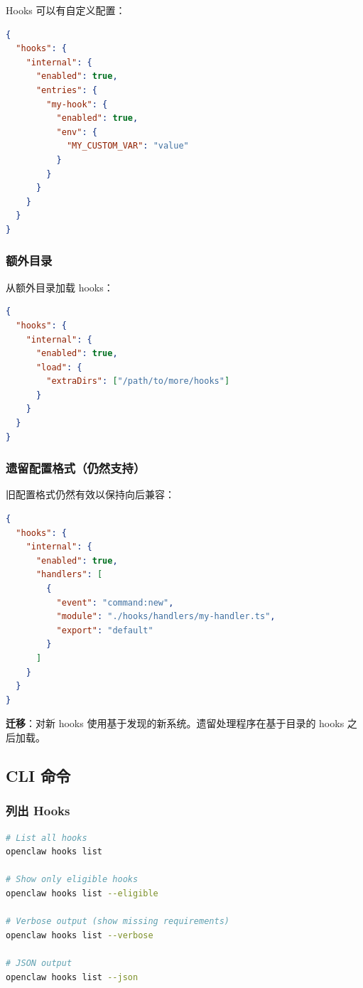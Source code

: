 Hooks 可以有自定义配置：

\begin{lstlisting}[language=json]
{
  "hooks": {
    "internal": {
      "enabled": true,
      "entries": {
        "my-hook": {
          "enabled": true,
          "env": {
            "MY_CUSTOM_VAR": "value"
          }
        }
      }
    }
  }
}
\end{lstlisting}


\subsubsection{额外目录}


从额外目录加载 hooks：

\begin{lstlisting}[language=json]
{
  "hooks": {
    "internal": {
      "enabled": true,
      "load": {
        "extraDirs": ["/path/to/more/hooks"]
      }
    }
  }
}
\end{lstlisting}


\subsubsection{遗留配置格式（仍然支持）}


旧配置格式仍然有效以保持向后兼容：

\begin{lstlisting}[language=json]
{
  "hooks": {
    "internal": {
      "enabled": true,
      "handlers": [
        {
          "event": "command:new",
          "module": "./hooks/handlers/my-handler.ts",
          "export": "default"
        }
      ]
    }
  }
}
\end{lstlisting}


\textbf{迁移}：对新 hooks 使用基于发现的新系统。遗留处理程序在基于目录的 hooks 之后加载。

\subsection{CLI 命令}


\subsubsection{列出 Hooks}


\begin{lstlisting}[language=bash]
# List all hooks
openclaw hooks list

# Show only eligible hooks
openclaw hooks list --eligible

# Verbose output (show missing requirements)
openclaw hooks list --verbose

# JSON output
openclaw hooks list --json
\end{lstlisting}


